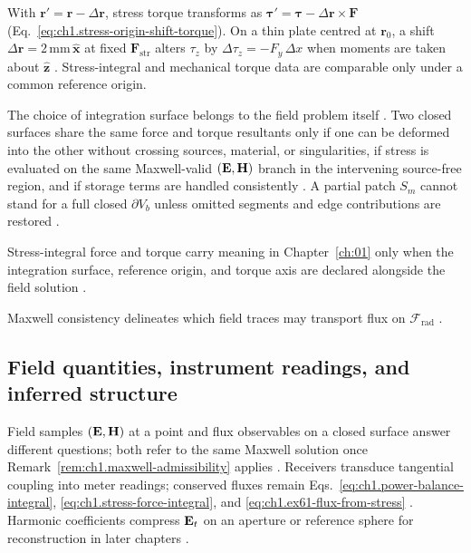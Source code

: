 \begin{example}
\label{ex:ch1.origin-shift}
With $\mathbf{r}'=\mathbf{r}-\Delta\mathbf{r}$, stress torque transforms as $\boldsymbol{\tau}'=\boldsymbol{\tau}-\Delta\mathbf{r}\times\mathbf{F}$ (Eq.~\eqref{eq:ch1.stress-origin-shift-torque}). On a thin plate centred at $\mathbf{r}_0$, a shift $\Delta\mathbf{r}=2\,\mathrm{mm}\,\hat{\mathbf{x}}$ at fixed $\mathbf{F}_{\mathrm{str}}$ alters $\tau_z$ by $\Delta\tau_z=-F_y\,\Delta x$ when moments are taken about $\hat{\mathbf{z}}$ \cite{stratton1941}. Stress-integral and mechanical torque data are comparable only under a common reference origin.
\end{example}

The choice of integration surface belongs to the field problem itself \cite{stratton1941}. Two closed surfaces share the same force and torque resultants only if one can be deformed into the other without crossing sources, material, or singularities, if stress is evaluated on the same Maxwell-valid $(\mathbf{E},\mathbf{H})$ branch in the intervening source-free region, and if storage terms are handled consistently \cite{maxwell1873,stratton1941}. A partial patch $S_m$ cannot stand for a full closed $\partial V_b$ unless omitted segments and edge contributions are restored \cite{stratton1941}.

\label{prop:ch1.stress-torque-admissibility}
Stress-integral force and torque carry meaning in Chapter~\ref{ch:01} only when the integration surface, reference origin, and torque axis are declared alongside the field solution \cite{stratton1941,beth1936}.

Maxwell consistency delineates which field traces may transport flux on $\mathcal{F}_{\mathrm{rad}}$ \cite{stratton1941}.
\subsection{Field quantities, instrument readings, and inferred structure}
\label{sec:ch01.5.3}

Field samples $(\mathbf{E},\mathbf{H})$ at a point and flux observables on a closed surface answer different questions; both refer to the same Maxwell solution once Remark~\ref{rem:ch1.maxwell-admissibility} applies \cite{maxwell1873,stratton1941}. Receivers transduce tangential coupling into meter readings; conserved fluxes remain Eqs.~\eqref{eq:ch1.power-balance-integral}, \eqref{eq:ch1.stress-force-integral}, and \eqref{eq:ch1.ex61-flux-from-stress} \cite{poynting1884,beth1936}. Harmonic coefficients compress $\mathbf{E}_t$ on an aperture or reference sphere for reconstruction in later chapters \cite{hansen1988,harrington2001}.

